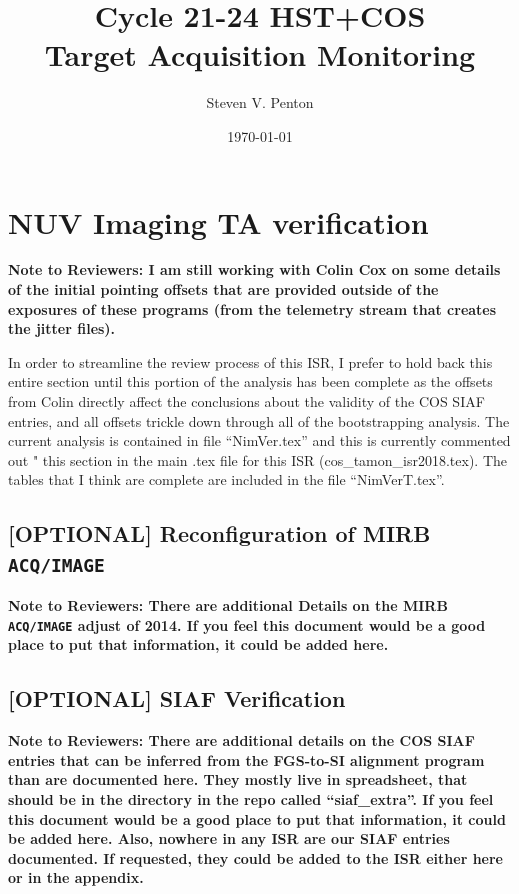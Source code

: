 \documentclass{stsci_report}
\title{\textbf{Cycle 21-24 HST+COS\\Target Acquisition Monitoring}}
\author{Steven V. Penton}
\date{\today}
\newcommand{\tacq}[1]{\texttt{ACQ/#1}}
\begin{document}
\maketitle


\clearpage
\tableofcontents
\listoffigures
\listoftables
\newpage
%

\clearpage



\clearpage





\clearpage



\clearpage
\section{NUV Imaging TA verification}\label{sec:NimVER}
{\bf Note to Reviewers: I am still working with Colin Cox on some details of the
initial pointing offsets that are provided outside of the exposures of these programs (from the telemetry stream that creates the jitter files).

In order to streamline the review process of this ISR, I prefer
to hold back this entire section until this portion of the
analysis has been complete as the offsets from Colin directly
affect the conclusions about the validity of the COS SIAF entries, and all offsets trickle down through all of the bootstrapping
analysis. The current analysis is contained in file ``NimVer.tex''
and this is currently commented out "%
this section in the main .tex file for this ISR (cos\_tamon\_isr2018.tex).
The tables that I think are complete are included in the file ``NimVerT.tex''.}



\subsection{[OPTIONAL] Reconfiguration of MIRB \tacq{IMAGE}} \label{subsec:newMIRB}
{\bf Note to Reviewers: There are additional Details on the MIRB \tacq{IMAGE} adjust of 2014.
If you feel this document would be a good place to put that information, it could be added here.}\\

\subsection{[OPTIONAL] SIAF Verification} \label{sec:siaf}\label{subsec:siafextra}
{\bf Note to Reviewers: There are additional details on the COS SIAF entries that can be inferred from the FGS-to-SI alignment program than are documented here. They mostly live in spreadsheet, that
should be in the directory in the repo called ``siaf\_extra''. If you feel this document would be a good place to put that information, it could be added here.
Also, nowhere in any ISR are our SIAF entries documented. If requested, they could be added to the ISR either here or in the appendix.}

\end{document}
